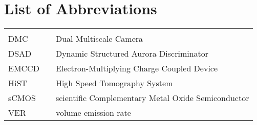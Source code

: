 
\begin{abstractpage}

\end{abstractpage}
\cleardoublepage


\tableofcontents
\cleardoublepage

\newpage
\listoftables
\cleardoublepage

\newpage
\listoffigures
\cleardoublepage

\chapter*{List of Abbreviations}
\begin{center}
  \begin{tabular}{lll}
    \hspace*{2em} & \hspace*{1in} & \hspace*{4.5in} \\
    DMC & \dotfill & Dual Multiscale Camera \\
    DSAD & \dotfill & Dynamic Structured Aurora Discriminator \\
    EMCCD  & \dotfill & Electron-Multiplying Charge Coupled Device \\
    HiST & \dotfill & High Speed Tomography System \\
    sCMOS & \dotfill & scientific Complementary Metal Oxide Semiconductor \\
    VER & \dotfill & volume emission rate \\


  \end{tabular}
\end{center}
\cleardoublepage


\newpage
\endofprelim
